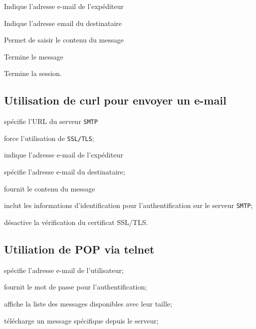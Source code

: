 \documentclass[a4paper]{report}
\begin{document}
      Indique l'adresse e-mail de l'expéditeur

     Indique l'adresse email du destinataire

     Permet de saisir le contenu du message

     Termine le message 


     Termine la session. 

    \subsection{Utilisation de curl pour envoyer un e-mail}
 spécifie l'URL du serveur \texttt{SMTP}    

     force l'utilisation de \texttt{SSL/TLS};  

     indique l'adresse e-mail de l'expéditeur 

    spécifie l'adresse e-mail du destinataire;  

    fournit le contenu du message  

     inclut les informations
    d'identification 
    pour l'authentification sur le serveur \texttt{SMTP};  

    désactive la vérification du certificat SSL/TLS.

\subsection{Utiliation de POP via telnet}
 spécifie l'adresse e-mail de l'utilisateur;  

     fournit le mot de passe pour 
    l'authentification;  

     affiche la liste des messages 
    disponibles avec leur taille;  

     télécharge un message spécifique 
    depuis le serveur;  
\end{document}
